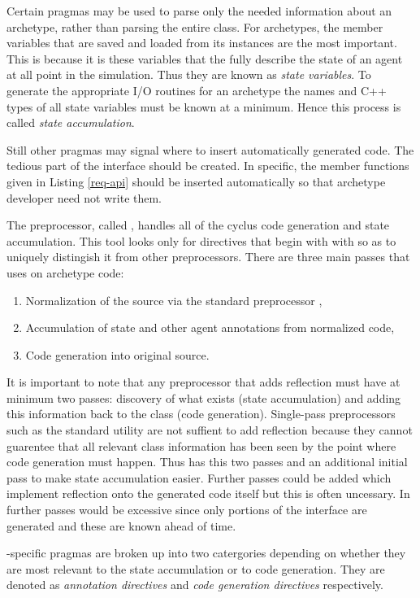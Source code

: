 Certain pragmas may be used to parse only the needed information 
about an archetype, rather than parsing the entire class. For archetypes, the 
member variables that are saved and loaded from its instances are the most important.
This is because it is these variables that the fully describe the state of an agent 
at all point in the simulation. Thus they are known as \emph{state variables}. 
To generate the appropriate I/O routines for an archetype the names and C++ types 
of all state variables must be known at a minimum. Hence this process is 
called \emph{state accumulation}. 

Still other pragmas may 
signal where to insert automatically generated code. The tedious 
part of the  interface should be created. In specific, 
the member functions given in Listing \ref{req-api} should be inserted automatically
so that archetype developer need not write them.

The \cyclus preprocessor, called \cycpp, handles all of the cyclus code generation
and state accumulation. This tool looks only for directives that begin with 
with  so as to uniquely distingish it from other preprocessors.
There are three main passes that \cycpp uses on archetype code:
\begin{enumerate}
    \item Normalization of the source via the standard preprocessor , 
    \item Accumulation of state and other agent annotations from normalized code, 
    \item Code generation into original source.
\end{enumerate}
It is important to note that any preprocessor that adds reflection must have at
minimum two passes: discovery of what exists (state accumulation) and adding this
information back to the class (code generation). Single-pass preprocessors such 
as the standard  utility are not suffient to add reflection because they 
cannot guarentee that all relevant class information has been seen by the point 
where code generation must happen. Thus \cycpp has this two passes and an additional 
initial pass to make state accumulation easier. Further passes could be added which 
implement reflection onto the generated code itself but this is often uncessary. 
In \cyclus further passes would be excessive since only portions of the 
 interface are generated and these are known ahead of time.

\cyclus-specific pragmas are broken up into two catergories depending on whether 
they are most relevant to the state accumulation or to code generation. They 
are denoted as \emph{annotation directives} and \emph{code generation directives}
respectively.

